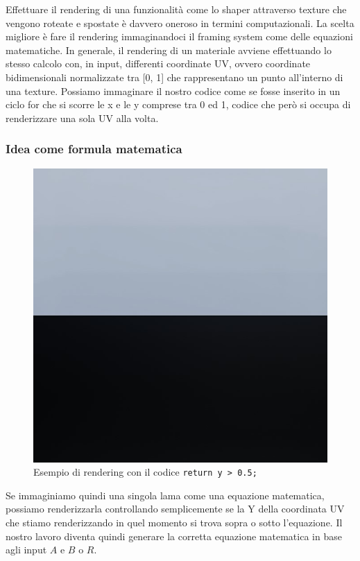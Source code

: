 \documentclass[main.tex]{subfiles}
\begin{document}
\noindent Effettuare il rendering di una funzionalità come lo shaper attraverso texture che vengono roteate e spostate è davvero oneroso in termini computazionali. La scelta migliore è fare il rendering immaginandoci il framing system come delle equazioni matematiche. In generale, il rendering di un materiale avviene effettuando lo stesso calcolo con, in input, differenti coordinate UV, ovvero coordinate bidimensionali normalizzate tra [0, 1] che rappresentano un punto all'interno di una texture. Possiamo immaginare il nostro codice come se fosse inserito in un ciclo for che si scorre  le x e le y comprese tra 0 ed 1, codice che però si occupa di renderizzare una sola UV alla volta. 

\clearpage %
\subsubsection{Idea come formula matematica}\label{subsec:5_1_ShaperMath}
\begin{figure}
    \centering
    \captionsetup{justification=centering}
    \includegraphics[scale=0.35]{img/newFeatures/eqExample.jpg}
    \caption{Esempio di rendering con il codice \lstinline{return y > 0.5;}}
    \label{fig:5_eqExample}
\end{figure}
Se immaginiamo quindi una singola lama come una equazione matematica, possiamo renderizzarla controllando semplicemente se la Y della coordinata UV che stiamo renderizzando in quel momento si trova sopra o sotto l'equazione. Il nostro lavoro diventa quindi generare la corretta equazione matematica in base agli input $A$ e $B$ o $R$.
\end{document}
